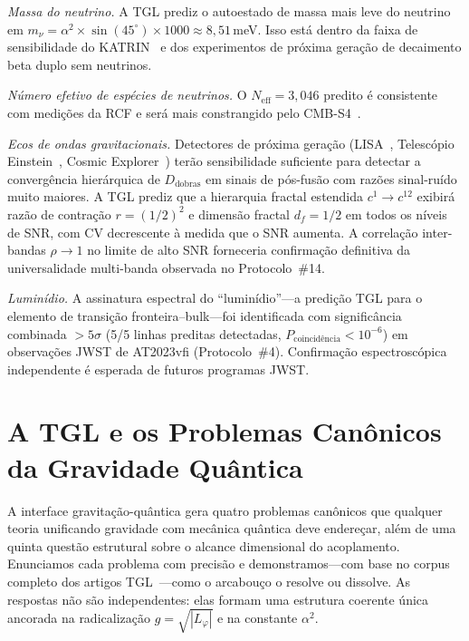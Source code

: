 \documentclass[12pt,a4paper,twocolumn]{article}
\newcommand{\alphaii}{\alpha^{2}}
\newcommand{\Dfolds}{D_{\text{dobras}}}
\begin{document}
\textit{Massa do neutrino.} A TGL prediz o autoestado de massa mais leve do neutrino em $m_\nu = \alphaii \times \sin(45^\circ) \times 1000 \approx 8{,}51$\,meV. Isso está dentro da faixa de sensibilidade do KATRIN~\cite{KATRIN2022} e dos experimentos de próxima geração de decaimento beta duplo sem neutrinos.

\textit{Número efetivo de espécies de neutrinos.} O $N_{\text{eff}} = 3{,}046$ predito é consistente com medições da RCF e será mais constrangido pelo CMB-S4~\cite{CMBS4}.

\textit{Ecos de ondas gravitacionais.} Detectores de próxima geração (LISA~\cite{LISA2017}, Telescópio Einstein~\cite{ET2020}, Cosmic Explorer~\cite{CE2019}) terão sensibilidade suficiente para detectar a convergência hierárquica de $\Dfolds$ em sinais de pós-fusão com razões sinal-ruído muito maiores. A TGL prediz que a hierarquia fractal estendida $c^1 \to c^{12}$ exibirá razão de contração $r = (1/2)^2$ e dimensão fractal $d_f = 1/2$ em todos os níveis de SNR, com CV decrescente à medida que o SNR aumenta. A correlação inter-bandas $\rho \to 1$ no limite de alto SNR forneceria confirmação definitiva da universalidade multi-banda observada no Protocolo~\#14.

\textit{Luminídio.} A assinatura espectral do ``luminídio''---a predição TGL para o elemento de transição fronteira--bulk---foi identificada com significância combinada $> 5\sigma$ (5/5 linhas preditas detectadas, $P_{\text{coincidência}} < 10^{-6}$) em observações JWST de AT2023vfi (Protocolo~\#4). Confirmação espectroscópica independente é esperada de futuros programas JWST.


\section{A TGL e os Problemas Canônicos da Gravidade Quântica}
\label{sec:quantum_gravity}

A interface gravitação-quântica gera quatro problemas canônicos que qualquer
teoria unificando gravidade com mecânica quântica deve endereçar, além de uma
quinta questão estrutural sobre o alcance dimensional do acoplamento.
Enunciamos cada problema com precisão e demonstramos---com base no corpus
completo dos artigos TGL~\cite{Miguel2026Fronteira}---como o arcabouço o
resolve ou dissolve. As respostas não são independentes: elas formam uma
estrutura coerente única ancorada na radicalização $g = \sqrt{|L_\varphi|}$
e na constante $\alphaii$.
\end{document}
